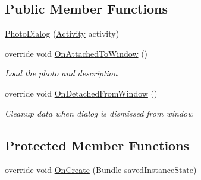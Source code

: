 \subsection*{Public Member Functions}
\begin{DoxyCompactItemize}
\item 
\hyperlink{class_field_service_1_1_android_1_1_dialogs_1_1_photo_dialog_a65724b330b03fb308742f727cce177cf}{Photo\+Dialog} (\hyperlink{class_field_service_1_1_android_1_1_dialogs_1_1_photo_dialog_a2540d4a80bb5309d8ff3b4f17b86a73b}{Activity} activity)
\item 
override void \hyperlink{class_field_service_1_1_android_1_1_dialogs_1_1_photo_dialog_aa4697ea76fcfc17d2d99a212ab179af6}{On\+Attached\+To\+Window} ()
\begin{DoxyCompactList}\small\item\em Load the photo and description \end{DoxyCompactList}\item 
override void \hyperlink{class_field_service_1_1_android_1_1_dialogs_1_1_photo_dialog_a649299742bbbe8971e58235db6722d99}{On\+Detached\+From\+Window} ()
\begin{DoxyCompactList}\small\item\em Cleanup data when dialog is dismissed from window \end{DoxyCompactList}\end{DoxyCompactItemize}
\subsection*{Protected Member Functions}
\begin{DoxyCompactItemize}
\item 
override void \hyperlink{class_field_service_1_1_android_1_1_dialogs_1_1_photo_dialog_a56a6cd75942ba2c09b37fa4755432880}{On\+Create} (Bundle saved\+Instance\+State)
\end{DoxyCompactItemize}
